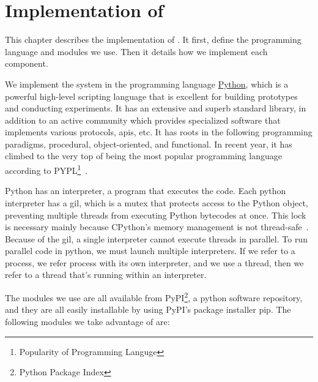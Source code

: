 
\chapter{Implementation of \project}\label{ch:implementation}\glsresetall
This chapter describes the implementation of \project. It first, define the programming language and modules we use. Then it details how we implement each component.

We implement the system in the programming language \href{https://www.python.org/}{Python}, which is a powerful high-level scripting language that is excellent for building prototypes and conducting experiments. It has an extensive and superb standard library, in addition to an active community which provides specialized software that implements various protocols, \acp{api}, etc. It has roots in the following programming paradigms, procedural, object-oriented, and functional. In recent year, it has climbed to the very top of being the most popular programming language according to PYPL\footnote{Popularity of Programming Languge}~\cite{pypl_python}.

Python has an interpreter, a program that executes the code. Each python interpreter has a \ac{gil}, which is a mutex that protects access to the Python object, preventing multiple threads from executing Python bytecodes at once. This lock is necessary mainly because CPython's memory management is not thread-safe~\cite{python_gil}. Because of the \ac{gil}, a single interpreter cannot execute threads in parallel. To run parallel code in python, we must launch multiple interpreters. If we refer to a process, we refer process with its own interpreter, and we use a thread, then we refer to a thread that's running within an interpreter.

The modules we use are all available from PyPI\footnote{Python Package Index}, a python software repository, and they are all easily installable by using PyPI's package installer pip. The following modules we take advantage of are:


